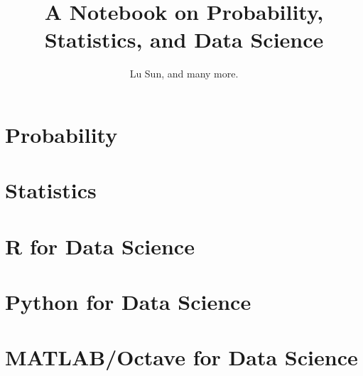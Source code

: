 



\makeindex



\frontmatter

\title{A Notebook on Probability, Statistics, and Data Science}
\author{Lu Sun, and many more.}

\maketitle


\tableofcontents


\listoffigures
\listoftables

\mainmatter

\part{Probability}







\part{Statistics}












\part{R for Data Science}





\part{Python for Data Science}









\part{MATLAB/Octave for Data Science}






\printindex


